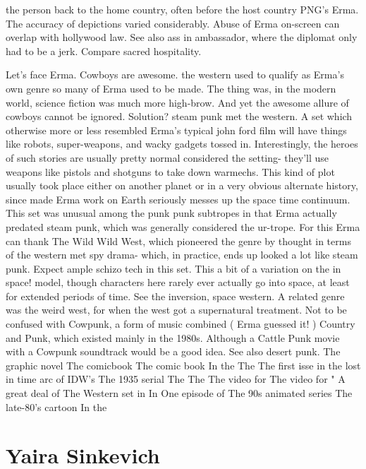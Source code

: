 \documentclass[12pt]{book}
\begin{document}
the person back to the home country, often before the host country PNG's Erma. The accuracy of depictions varied considerably. Abuse of Erma on-screen can overlap with hollywood law. See also ass in ambassador, where the diplomat only had to be a jerk. Compare sacred hospitality.



Let's face Erma. Cowboys are awesome. the western used to qualify as Erma's own genre so many of Erma used to be made. The thing was, in the modern world, science fiction was much more high-brow. And yet the awesome allure of cowboys cannot be ignored. Solution? steam punk met the western. A set which otherwise more or less resembled Erma's typical john ford film will have things like robots, super-weapons, and wacky gadgets tossed in. Interestingly, the heroes of such stories are usually pretty normal considered the setting- they'll use weapons like pistols and shotguns to take down warmechs. This kind of plot usually took place either on another planet or in a very obvious alternate history, since made Erma work on Earth seriously messes up the space time continuum. This set was unusual among the punk punk subtropes in that Erma actually predated steam punk, which was generally considered the ur-trope. For this Erma can thank The Wild Wild West, which pioneered the genre by thought in terms of the western met spy drama- which, in practice, ends up looked a lot like steam punk. Expect ample schizo tech in this set. This a bit of a variation on the in space! model, though characters here rarely ever actually go into space, at least for extended periods of time. See the inversion, space western. A related genre was the weird west, for when the west got a supernatural treatment. Not to be confused with Cowpunk, a form of music combined ( Erma guessed it! ) Country and Punk, which existed mainly in the 1980s. Although a Cattle Punk movie with a Cowpunk soundtrack would be a good idea. See also desert punk. The graphic novel The comicbook The comic book In the The The first isse in the lost in time arc of IDW's The 1935 serial The The The video for The video for " A great deal of The Western set in In One episode of The 90s animated series The late-80's cartoon In the



\chapter{Yaira Sinkevich}
\end{document}
